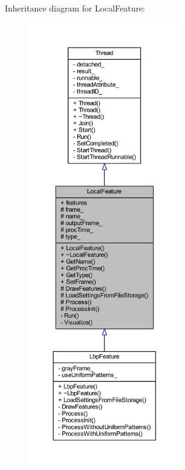 Inheritance diagram for Local\-Feature\-:
\nopagebreak
\begin{figure}[H]
\begin{center}
\leavevmode
\includegraphics[height=550pt]{class_local_feature__inherit__graph}
\end{center}
\end{figure}


